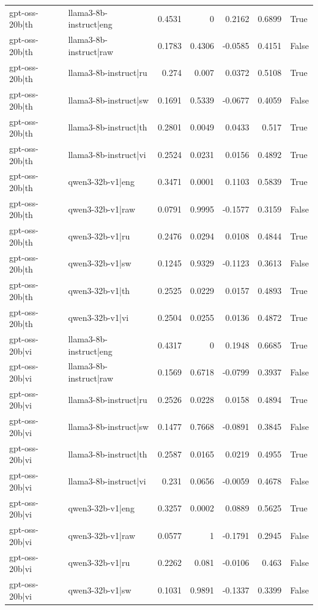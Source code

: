 \begin{table}
\begin{tabular}{l l r r r r l}
gpt-oss-20b|th & llama3-8b-instruct|eng & 0.4531 & 0 & 0.2162 & 0.6899 & True \\
gpt-oss-20b|th & llama3-8b-instruct|raw & 0.1783 & 0.4306 & -0.0585 & 0.4151 & False \\
gpt-oss-20b|th & llama3-8b-instruct|ru & 0.274 & 0.007 & 0.0372 & 0.5108 & True \\
gpt-oss-20b|th & llama3-8b-instruct|sw & 0.1691 & 0.5339 & -0.0677 & 0.4059 & False \\
gpt-oss-20b|th & llama3-8b-instruct|th & 0.2801 & 0.0049 & 0.0433 & 0.517 & True \\
gpt-oss-20b|th & llama3-8b-instruct|vi & 0.2524 & 0.0231 & 0.0156 & 0.4892 & True \\
gpt-oss-20b|th & qwen3-32b-v1|eng & 0.3471 & 0.0001 & 0.1103 & 0.5839 & True \\
gpt-oss-20b|th & qwen3-32b-v1|raw & 0.0791 & 0.9995 & -0.1577 & 0.3159 & False \\
gpt-oss-20b|th & qwen3-32b-v1|ru & 0.2476 & 0.0294 & 0.0108 & 0.4844 & True \\
gpt-oss-20b|th & qwen3-32b-v1|sw & 0.1245 & 0.9329 & -0.1123 & 0.3613 & False \\
gpt-oss-20b|th & qwen3-32b-v1|th & 0.2525 & 0.0229 & 0.0157 & 0.4893 & True \\
gpt-oss-20b|th & qwen3-32b-v1|vi & 0.2504 & 0.0255 & 0.0136 & 0.4872 & True \\
gpt-oss-20b|vi & llama3-8b-instruct|eng & 0.4317 & 0 & 0.1948 & 0.6685 & True \\
gpt-oss-20b|vi & llama3-8b-instruct|raw & 0.1569 & 0.6718 & -0.0799 & 0.3937 & False \\
gpt-oss-20b|vi & llama3-8b-instruct|ru & 0.2526 & 0.0228 & 0.0158 & 0.4894 & True \\
gpt-oss-20b|vi & llama3-8b-instruct|sw & 0.1477 & 0.7668 & -0.0891 & 0.3845 & False \\
gpt-oss-20b|vi & llama3-8b-instruct|th & 0.2587 & 0.0165 & 0.0219 & 0.4955 & True \\
gpt-oss-20b|vi & llama3-8b-instruct|vi & 0.231 & 0.0656 & -0.0059 & 0.4678 & False \\
gpt-oss-20b|vi & qwen3-32b-v1|eng & 0.3257 & 0.0002 & 0.0889 & 0.5625 & True \\
gpt-oss-20b|vi & qwen3-32b-v1|raw & 0.0577 & 1 & -0.1791 & 0.2945 & False \\
gpt-oss-20b|vi & qwen3-32b-v1|ru & 0.2262 & 0.081 & -0.0106 & 0.463 & False \\
gpt-oss-20b|vi & qwen3-32b-v1|sw & 0.1031 & 0.9891 & -0.1337 & 0.3399 & False \\

\end{tabular}
\end{table}
